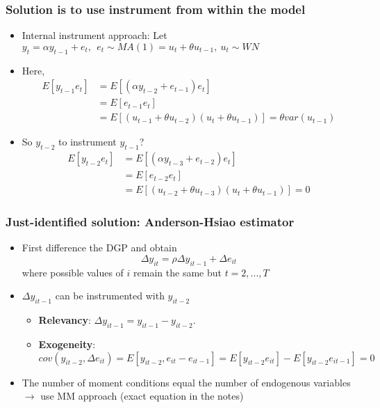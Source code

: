 \documentclass[aspectratio=169]{beamer}
\begin{document}
\begin{frame}
\frametitle{Solution is to use instrument from within the model}
\begin{itemize}
\item Internal instrument approach: Let $y_{t}=\alpha y_{t-1}+e_t, \ \ e_t\sim MA(1)= u_t+\theta u_{t-1}, \ u_t\sim WN$
\item Here,
\[
\begin{aligned}
E[y_{t-1}e_t]&=E[(\alpha y_{t-2}+e_{t-1})e_t]\\
&=E[e_{t-1}e_t]\\
&=E[(u_{t-1}+\theta u_{t-2})(u_{t}+\theta u_{t-1})]=\theta var(u_{t-1})
\end{aligned}
\]
\item So $y_{t-2}$ to instrument $y_{t-1}$?
\[
\begin{aligned}
E[y_{t-2}e_t]&=E[(\alpha y_{t-3}+e_{t-2})e_t]\\
&=E[e_{t-2}e_t]\\
&=E[(u_{t-2}+\theta u_{t-3})(u_{t}+\theta u_{t-1})]=0
\end{aligned}
\]
 \end{itemize}
\end{frame}

\begin{frame}
\frametitle{Just-identified solution: Anderson-Hsiao estimator}
\begin{itemize}
\item First difference the DGP and obtain
\[
\Delta y_{it}=\rho\Delta  y_{it-1} +\Delta e_{it}
\]
where possible values of $i$ remain the same but $t=2,...,T$
\item $\Delta y_{it-1}$ can be instrumented with $y_{it-2}$
\begin{itemize}
\item \textbf{Relevancy}: $\Delta y_{it-1}= y_{it-1}-y_{it-2}$. 
\item \textbf{Exogeneity}: $cov(y_{it-2},\Delta e_{it})=E[y_{it-2}, e_{it}-e_{it-1}]
=E[y_{it-2}e_{it}]-E[y_{it-2}e_{it-1}]=0$
 \end{itemize}
 \item The number of moment conditions equal the number of endogenous variables $\to$ use MM approach (exact equation in the notes)
 \end{itemize} 
\end{frame}
\end{document}
